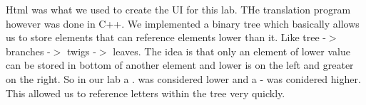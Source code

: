 Html was what we used to create the U\+I for this lab. T\+He translation program however was done in C++. We implemented a binary tree which basically allows us to store elements that can reference elements lower than it. Like tree -\/$>$ branches -\/$>$ twigs -\/$>$ leaves. The idea is that only an element of lower value can be stored in bottom of another element and lower is on the left and greater on the right. So in our lab a . was considered lower and a -\/ was conidered higher. This allowed us to reference letters within the tree very quickly. 